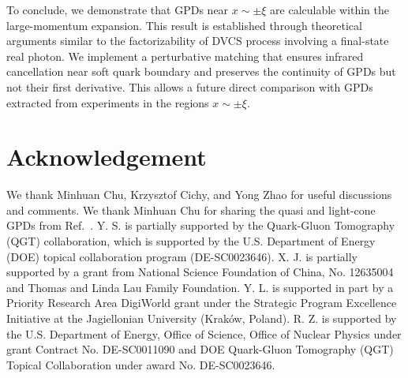 \documentclass[prl,aps,twocolumn,preprintnumbers, showpacs, nofootinbib,superscriptaddress,notitlepage]{revtex4-1}
\begin{document}
To conclude, we demonstrate that GPDs near $x \sim \pm \xi$ are calculable within the large-momentum expansion. This result is established through theoretical arguments similar to the factorizability of DVCS process involving a final-state real photon. We implement a perturbative matching that ensures infrared cancellation near soft quark boundary and preserves the continuity of GPDs but not their first derivative. This allows a future direct comparison with GPDs extracted from experiments in the regions $x \sim \pm \xi$.


\section*{Acknowledgement}
We thank Minhuan Chu, Krzysztof Cichy, and Yong Zhao for useful discussions and comments. We thank Minhuan Chu for sharing the quasi and light-cone GPDs from Ref.~\cite{Chu:2025kew}. Y. S. is partially supported by the Quark-Gluon Tomography (QGT) collaboration, which is supported by the U.S. Department of Energy (DOE) topical collaboration program (DE-SC0023646). X. J. is partially supported by a grant from National Science Foundation of China, No. 12635004 and Thomas and Linda Lau Family Foundation. Y. L. is supported in part by a Priority Research Area DigiWorld grant under the Strategic Program Excellence Initiative at the Jagiellonian University (Kraków, Poland). R. Z. is supported by the U.S. Department of Energy, Office of Science, Office of Nuclear Physics under grant Contract No. DE-SC0011090 and DOE Quark-Gluon Tomography (QGT) Topical Collaboration under award No. DE-SC0023646.






\end{document}
